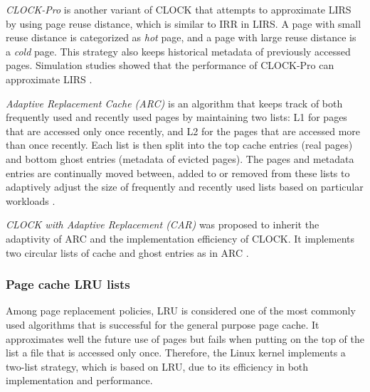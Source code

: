 \textit{CLOCK-Pro} is another variant of CLOCK that attempts to approximate 
LIRS by using page reuse distance, which is similar to IRR in LIRS. 
A page with small reuse distance is categorized as \textit{hot} page, 
and a page with large reuse distance is a \textit{cold} page. This strategy also 
keeps historical metadata of previously accessed pages. 
Simulation studies showed that the performance of CLOCK-Pro can 
approximate LIRS \cite{chavan2011comparison}. 

\textit{Adaptive Replacement Cache (ARC)} is an algorithm that keeps track of
both frequently used and recently used pages by maintaining two lists: 
L1 for pages that are accessed only once recently, and L2 for the pages 
that are accessed more than once recently. 
Each list is then split into the top cache entries (real pages) and bottom 
ghost entries (metadata of evicted pages). 
The pages and metadata entries are continually moved between, 
added to or removed from these lists to adaptively adjust the size 
of frequently and recently used lists based on particular workloads  
\cite{chavan2011comparison}. 

\textit{CLOCK with Adaptive Replacement (CAR)} was proposed to inherit 
the adaptivity of ARC and the implementation efficiency of CLOCK.  
It implements two circular lists of cache and ghost entries as in ARC 
\cite{chavan2011comparison}. 

\subsubsection{Page cache LRU lists}

Among page replacement policies, LRU is considered one of the most commonly 
used algorithms that is successful for the general purpose page cache. 
It approximates well the future use of pages but fails when putting on the 
top of the list a file that is accessed only once. 
Therefore, the Linux kernel implements a two-list strategy, which is based on LRU, 
due to its efficiency in both implementation and performance. 

